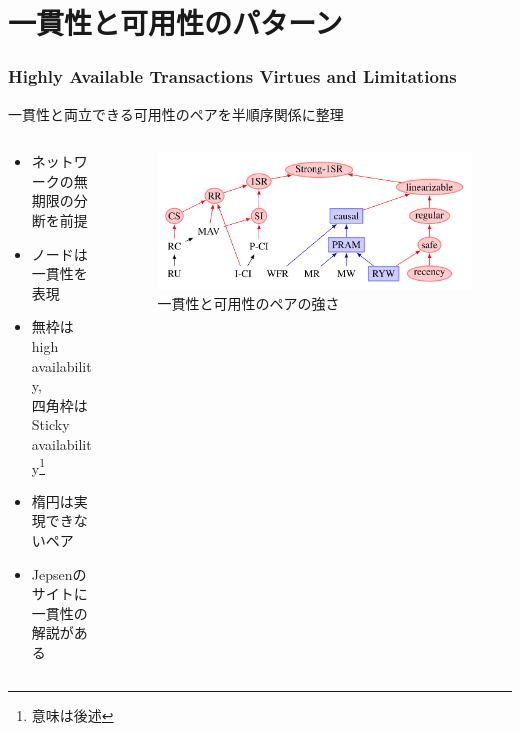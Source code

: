 \documentclass[unicode, 14pt, aspectratio=169]{beamer}
\begin{document}
\section{一貫性と可用性のパターン}
\begin{frame}
  \frametitle{\normalsize{Highly Available Transactions Virtues and Limitations\supercite{high}}}
  {\large 一貫性と両立できる可用性のペアを半順序関係に整理}
  \begin{columns}
    \begin{column}{0.5\textwidth}
      \begin{itemize}
      \item {\small ネットワークの無期限の分断を前提}
      \item {\small ノードは一貫性を表現}
      \item {\small 無枠はhigh availability,\\四角枠はSticky availability\footnote{意味は後述}}
      \item {\small 楕円は実現できないペア}        
      \item {\small Jepsenのサイトに一貫性の\\解説がある\supercite{jepsen-models}}
      \end{itemize}
    \end{column}    
    \begin{column}{0.5\textwidth}
      \begin{figure}
        \includegraphics[width=1\textwidth]{images/hat.png}
        \caption{一貫性と可用性のペアの強さ\supercite{high}}
      \end{figure}
    \end{column} 
  \end{columns}
\end{frame}
\end{document}

